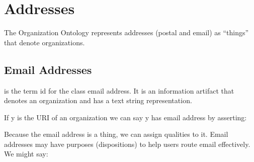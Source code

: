 \documentclass[letterpaper,10pt,english]{sphinxmanual}
\begin{document}
\begin{sphinxVerbatim}[commandchars=\\\{\}]
  
  
  
\end{sphinxVerbatim}
\label{\detokenize{addresses:addresses}}
\ignorespaces 

\chapter{Addresses}
\label{\detokenize{addresses:index-0}}\label{\detokenize{addresses:id1}}\label{\detokenize{addresses::doc}}
\sphinxAtStartPar
The Organization Ontology represents addresses (postal and email) as “things” that denote
organizations.


\section{Email Addresses}
\label{\detokenize{addresses:email-addresses}}
\sphinxAtStartPar
{} is the term id for the class email address. It is an information artifact
that denotes an
organization and has a text string representation.

\sphinxAtStartPar
If y is the URI of an organization we can say y has email address  by
asserting:

\begin{sphinxVerbatim}[commandchars=\\\{\}]
  
  
  
\end{sphinxVerbatim}

\sphinxAtStartPar
Because the email address is a thing, we can assign qualities to it. Email addresses may
have purposes (dispositions) to help users route email effectively. We might say:

\begin{sphinxVerbatim}[commandchars=\\\{\}]
  
  
\end{sphinxVerbatim}
\end{document}
